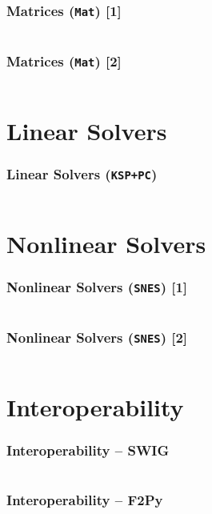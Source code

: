 \documentclass{beamer}
\begin{document}
\begin{frame}
  \frametitle{Matrices (\texttt{Mat}) [1]}
  \small\inputminted[linenos]{python}{petsc4py_mat_1.py}
\end{frame}

\begin{frame}
  \frametitle{Matrices (\texttt{Mat}) [2]}
  \small\inputminted[linenos]{python}{petsc4py_mat_2.py}
\end{frame}


\section{Linear Solvers}

\begin{frame}
  \frametitle{Linear Solvers (\texttt{KSP+PC})}
  \small\inputminted[linenos]{python}{petsc4py_ksp.py}
\end{frame}


\section{Nonlinear Solvers}

\begin{frame}
  \frametitle{Nonlinear Solvers (\texttt{SNES}) [1]}
  \scriptsize\inputminted[linenos]{python}{petsc4py_snes_1.py}
\end{frame}

\begin{frame}
  \frametitle{Nonlinear Solvers (\texttt{SNES}) [2]}
  \small\inputminted[linenos]{python}{petsc4py_snes_2.py}
\end{frame}


\section{Interoperability}

\begin{frame}
  \frametitle{Interoperability -- \textbf{SWIG}}
  \small
  \inputminted[linenos]{c}{wrap_swig.i}
\end{frame}

\begin{frame}
  \frametitle{Interoperability -- \textbf{F2Py}}
  \scriptsize
  \inputminted[linenos]{fortran}{wrap_f2py.pyf}
\end{frame}
\end{document}
